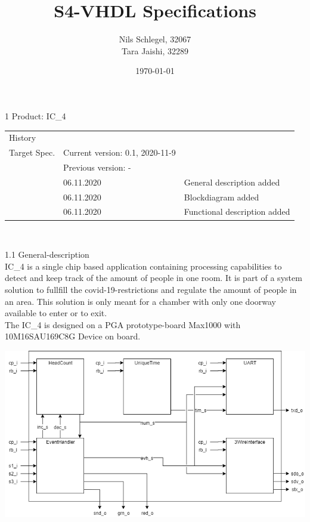 \documentclass[a4paper,12pt]{book}
\begin{document}
\title{S4-VHDL Specifications}
\author{Nils Schlegel, 32067\\Tara Jaishi, 32289}
\date{\today}
\maketitle %

\setcounter{chapter}{0}


1 Product: IC{\_}4 \\
\begin{center}
\begin{tabularx}{\textwidth}{llX}
History \\
\cline{1-3}
Target Spec. & Current version: 0.1, 2020-11-9 \\
& Previous version: - \\
\cline{1-3}
& 06.11.2020 & General description added \\
& 06.11.2020 & Blockdiagram added \\
& 06.11.2020 & Functional description added \\
\end{tabularx} \\
\end{center}
1.1 General-description \\
IC{\_}4 is a single chip based application containing processing capabilities to detect and keep track of the amount of people in one room. It is part of a system solution to fullfill the covid-19-restrictions and  regulate the amount of people in an area. This solution is only meant for a chamber with only one doorway available to enter or to exit. \\
The IC{\_}4 is designed on a PGA prototype-board Max1000 with 10M16SAU169C8G Device on board.

\begin{center}\includegraphics[width=1\textwidth]{./top}\end{center}
\end{document}
